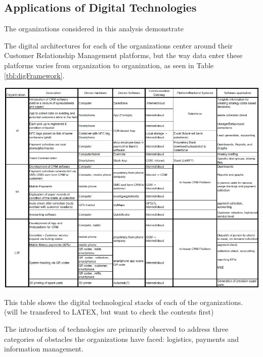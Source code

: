 \documentclass[sustainability,article,submit,moreauthors,pdftex,10pt,a4paper]{mdpi}
\theoremstyle{mdpi}
\newcounter{ex}
\newcounter{re}
\theoremstyle{mdpidefinition}
\begin{document}
\subsection{Applications of Digital Technologies}
The organizations considered in this analysis demonstrate 

The digital architectures for each of the organizations center around their Customer Relationship Management platforms, but the way data enter these platforms varies from organization to organization, as seen in Table \ref{tbl:digFramework}.




\begin{table}[H]
\centering
\includegraphics[width=\textwidth]{digFramTbl.jpg}
\caption{This table shows the digital technological stacks of each of the organizations. (will be transfered to LATEX, but want to check the contents first)}
\label{tbl:digFramework}
\end{table}   

The introduction of technologies are primarily observed to address three categories of obstacles the organizations have faced: logistics, payments and information management. 
\end{document}
